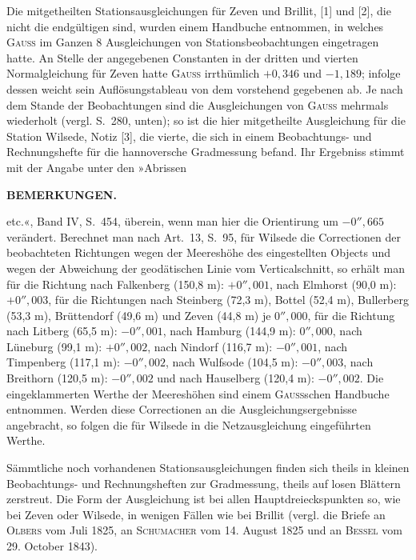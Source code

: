 Die mitgetheilten Stationsausgleichungen für Zeven und Brillit, [1] und [2], die nicht die endgültigen sind, wurden einem Handbuche entnommen, in welches \textsc{Gauss} im Ganzen 8 Ausgleichungen von Stationsbeobachtungen eingetragen hatte. An Stelle der angegebenen Constanten in der dritten und vierten Normalgleichung für Zeven hatte \textsc{Gauss} irrthümlich \(+0{,}346\) und \(-1{,}189\); infolge dessen weicht sein Auflösungstableau von dem vorstehend gegebenen ab. Je nach dem Stande der Beobachtungen sind die Ausgleichungen von \textsc{Gauss} mehrmals wiederholt (vergl. S.~280, unten); so ist die hier mitgetheilte Ausgleichung für die Station Wilsede, Notiz [3], die vierte, die sich in einem Beobachtungs- und Rechnungshefte für die hannoversche Gradmessung befand. Ihr Ergebniss stimmt mit der Angabe unter den »Abrissen

\par\clearpage
\noindent{}\hfill{\small\textbf{BEMERKUNGEN.}}\hfill\null\par\medskip

\noindent etc.«, Band IV, S.~454, überein, wenn man hier die Orientirung um \(-0''{,}665\) verändert. Berechnet man nach Art.~13, S.~95, für Wilsede die Correctionen der beobachteten Richtungen wegen der Meereshöhe des eingestellten Objects und wegen der Abweichung der geodätischen Linie vom Verticalschnitt, so erhält man für die Richtung nach Falkenberg (150,8 m): \(+0''{,}001\), nach Elmhorst (90,0 m): \(+0''{,}003\), für die Richtungen nach Steinberg (72,3 m), Bottel (52,4 m), Bullerberg (53,3 m), Brüttendorf (49,6 m) und Zeven (44,8 m) je \(0''{,}000\), für die Richtung nach Litberg (65,5 m): \(-0''{,}001\), nach Hamburg (144,9 m): \(0''{,}000\), nach Lüneburg (99,1 m): \(+0''{,}002\), nach Nindorf (116,7 m): \(-0''{,}001\), nach Timpenberg (117,1 m): \(-0''{,}002\), nach Wulfsode (104,5 m): \(-0''{,}003\), nach Breithorn (120,5 m): \(-0''{,}002\) und nach Hauselberg (120,4 m): \(-0''{,}002\). Die eingeklammerten Werthe der Meereshöhen sind einem \textsc{Gauss}schen Handbuche entnommen. Werden diese Correctionen an die Ausgleichungsergebnisse angebracht, so folgen die für Wilsede in die Netzausgleichung eingeführten Werthe.

Sämmtliche noch vorhandenen Stationsausgleichungen finden sich theils in kleinen Beobachtungs- und Rechnungsheften zur Gradmessung, theils auf losen Blättern zerstreut. Die Form der Ausgleichung ist bei allen Hauptdreieckspunkten so, wie bei Zeven oder Wilsede, in wenigen Fällen wie bei Brillit (vergl. die Briefe an \textsc{Olbers} vom Juli 1825, an \textsc{Schumacher} vom 14. August 1825 und an \textsc{Bessel} vom 29. October 1843).

